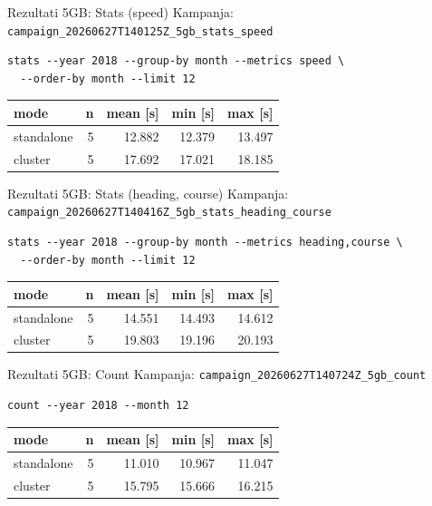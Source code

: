\documentclass[aspectratio=169,11pt]{beamer}
\newcommand{\code}[1]{\texttt{\small #1}}
\begin{document}
\begin{frame}[fragile]{Rezultati 5GB: Stats (speed)}
  Kampanja: \code{campaign\_20260627T140125Z\_5gb\_stats\_speed}

  \scriptsize
  \begin{verbatim}
stats --year 2018 --group-by month --metrics speed \
  --order-by month --limit 12
  \end{verbatim}
  \normalsize

  \begin{tabular}{lrrrr}
    \toprule
    mode & n & mean [s] & min [s] & max [s] \\
    \midrule
    standalone & 5 & 12.882 & 12.379 & 13.497 \\
    cluster & 5 & 17.692 & 17.021 & 18.185 \\
    \bottomrule
  \end{tabular}

\end{frame}

\begin{frame}[fragile]{Rezultati 5GB: Stats (heading, course)}
  Kampanja: \code{campaign\_20260627T140416Z\_5gb\_stats\_heading\_course}

  \scriptsize
  \begin{verbatim}
stats --year 2018 --group-by month --metrics heading,course \
  --order-by month --limit 12
  \end{verbatim}
  \normalsize

  \begin{tabular}{lrrrr}
    \toprule
    mode & n & mean [s] & min [s] & max [s] \\
    \midrule
    standalone & 5 & 14.551 & 14.493 & 14.612 \\
    cluster & 5 & 19.803 & 19.196 & 20.193 \\
    \bottomrule
  \end{tabular}

\end{frame}

\begin{frame}[fragile]{Rezultati 5GB: Count}
  Kampanja: \code{campaign\_20260627T140724Z\_5gb\_count}

  \begin{verbatim}
count --year 2018 --month 12
  \end{verbatim}

  \begin{tabular}{lrrrr}
    \toprule
    mode & n & mean [s] & min [s] & max [s] \\
    \midrule
    standalone & 5 & 11.010 & 10.967 & 11.047 \\
    cluster & 5 & 15.795 & 15.666 & 16.215 \\
    \bottomrule
  \end{tabular}
\end{frame}
\end{document}
